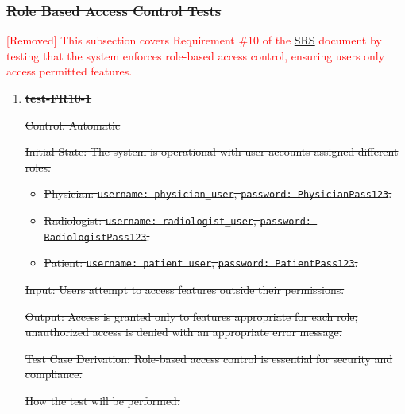 \documentclass[12pt, titlepage]{article}
\begin{document}
\subsubsection{\sout{Role Based Access Control Tests}}

\textcolor{red}{[Removed] This subsection covers Requirement \#10 of the \href{https://github.com/RezaJodeiri/CXR-Capstone/blob/main/docs/SRS/SRS.pdf}{SRS} \citep{SRS}
document by testing that the system enforces role-based access control, ensuring users only access permitted features.}

\begin{enumerate}
\item \textbf{\sout{test-FR10-1}} \label{test-FR10-1}

\sout{Control: Automatic}

\sout{Initial State: The system is operational with user accounts assigned different roles:}
\begin{itemize}
  \item \sout{Physician: \texttt{username: physician\_user}, \texttt{password: PhysicianPass123}.}
  \item \sout{Radiologist: \texttt{username: radiologist\_user}, \texttt{password: RadiologistPass123}.}
  \item \sout{Patient: \texttt{username: patient\_user}, \texttt{password: PatientPass123}.}
\end{itemize}

\sout{Input: Users attempt to access features outside their permissions.}

\sout{Output: Access is granted only to features appropriate for each role; unauthorized access is denied with an appropriate error message.}

\sout{Test Case Derivation: Role-based access control is essential for security and compliance.}

\sout{How the test will be performed:}


\end{enumerate}
\end{document}
